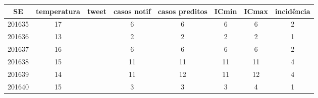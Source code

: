 \begin{tabular}{c|ccccccc}
  \hline
SE & temperatura & tweet & casos notif & casos preditos & ICmin & ICmax & incidência \\ 
  \hline
201635 & 17 &  & 6 & 6 & 6 & 6 & 2 \\ 
  201636 & 13 &  & 2 & 2 & 2 & 2 & 1 \\ 
  201637 & 16 &  & 6 & 6 & 6 & 6 & 2 \\ 
  201638 & 15 &  & 11 & 11 & 11 & 11 & 4 \\ 
  201639 & 14 &  & 11 & 12 & 11 & 12 & 4 \\ 
  201640 & 15 &  & 3 & 3 & 3 & 4 & 1 \\ 
   \hline
\end{tabular}
